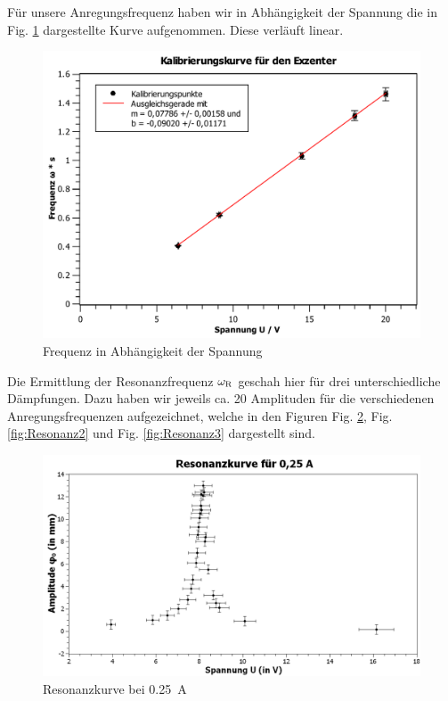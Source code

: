 \documentclass[11pt,a4paper,titlepage, ngerman]{article}
\newcommand{\reffig}[1]{Fig. \ref{fig:#1}}
\begin{document}
			Für unsere Anregungsfrequenz haben wir in Abhängigkeit der Spannung die in \reffig{Kalibrierkurve} dargestellte Kurve aufgenommen. Diese verläuft linear.			
			\begin{figure}[ht]
				\includegraphics[width=\textwidth]{Kalibrierungskurve.pdf}
				\caption{Frequenz in Abhängigkeit der Spannung}
				\label{fig:Kalibrierkurve}
			\end{figure}
			Die Ermittlung der Resonanzfrequenz  $\omega_\textsc{R}$ geschah hier für drei unterschiedliche Dämpfungen. Dazu haben wir jeweils ca. 20 Amplituden für die verschiedenen Anregungsfrequenzen aufgezeichnet, welche in den Figuren \reffig{Resonanz1}, \reffig{Resonanz2} und \reffig{Resonanz3} dargestellt sind. 
			\begin{figure}[ht]
				\includegraphics[width=\textwidth]{Resonanzkurve0,25A.png}
				\caption{Resonanzkurve bei \SI{0,25}{\A}}
				\label{fig:Resonanz1}
			\end{figure}
\end{document}
